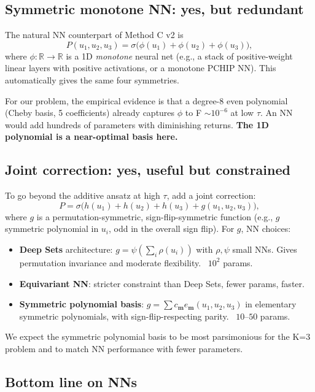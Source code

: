 \documentclass[11pt]{article}
\begin{document}
\subsection{Symmetric monotone NN: yes, but redundant}

The natural NN counterpart of Method C v2 is
\[
P(u_1, u_2, u_3) = \sigma\!\big( \phi(u_1) + \phi(u_2) + \phi(u_3) \big),
\]
where $\phi: \mathbb{R} \to \mathbb{R}$ is a 1D \emph{monotone}
neural net (e.g., a stack of positive-weight linear layers with
positive activations, or a monotone PCHIP NN). This automatically gives
the same four symmetries.

For our problem, the empirical evidence is that a degree-8 even polynomial
(Cheby basis, 5 coefficients) already captures $\phi$ to F $\sim 10^{-6}$
at low $\tau$. An NN would add hundreds of parameters with diminishing
returns. \textbf{The 1D polynomial is a near-optimal basis here.}

\subsection{Joint correction: yes, useful but constrained}

To go beyond the additive ansatz at high $\tau$, add a joint correction:
\[
P = \sigma\!\big( h(u_1) + h(u_2) + h(u_3) + g(u_1, u_2, u_3) \big),
\]
where $g$ is a permutation-symmetric, sign-flip-symmetric function
(e.g., $g$ symmetric polynomial in $u_i$, odd in the overall sign flip).
For $g$, NN choices:
\begin{itemize}
  \item \textbf{Deep Sets} architecture: $g = \psi(\sum_i \rho(u_i))$
        with $\rho, \psi$ small NNs. Gives permutation invariance and
        moderate flexibility. ~$10^2$ params.
  \item \textbf{Equivariant NN}: stricter constraint than Deep Sets, fewer
        params, faster.
  \item \textbf{Symmetric polynomial basis}: $g = \sum c_{\mathbf{m}}
        e_{\mathbf{m}}(u_1, u_2, u_3)$ in elementary symmetric polynomials,
        with sign-flip-respecting parity. ~$10$--$50$ params.
\end{itemize}

We expect the symmetric polynomial basis to be most parsimonious for
the K=3 problem and to match NN performance with fewer parameters.

\subsection{Bottom line on NNs}
\end{document}
